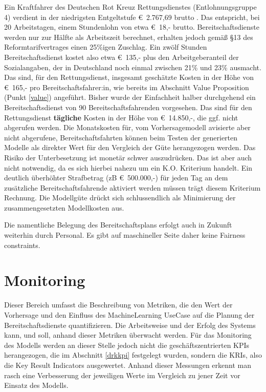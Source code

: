 Ein Kraftfahrer des Deutschen Rot Kreuz Rettungsdienstes (Entlohnungsgruppe 4) verdient in der niedrigsten Entgeltstufe €~2.767,69 brutto \citep{deutsches_rotes_kreuz_drk-reformtarifvertrag_2023}. Das entspricht, bei 20 Arbeitstagen, einem Stundenlohn von etwa €~18,- brutto. Bereitschaftsdienste werden nur zur Hälfte als Arbeitszeit berechnet, erhalten jedoch gemäß §13 des Reformtarifvertrages einen 25\%igen Zuschlag. Ein zwölf Stunden Bereitschaftsdienst kostet also etwa €~135,- plus den Arbeitgeberanteil der Sozialangaben, der in Deutschland noch einmal zwischen 21\% und 23\% ausmacht. Das sind, für den Rettungsdienst, insgesamt geschätzte Kosten in der Höhe von €~165,- pro Bereitschaftsfahrer:in, wie bereits im Abschnitt Value Proposition (Punkt \ref{value}) angeführt. Bisher wurde der Einfachheit halber durchgehend ein Bereitschaftsdienst von 90 Bereitschaftsfahrenden vorgesehen. Das sind für den Rettungsdienst \textbf{tägliche} Kosten in der Höhe von €~14.850,-, die ggf. nicht abgerufen werden. Die Monatskosten für, vom Vorhersagemodell avisierte aber nicht abgerufene, Bereitschaftsfahrten können beim Testen der generierten Modelle als direkter Wert für den Vergleich der Güte herangezogen werden. Das Risiko der Unterbesetzung ist monetär schwer auszudrücken. Das ist aber auch nicht notwendig, da es sich hierbei nahezu um ein K.O. Kriterium handelt. Ein deutlich überhöhter Strafbetrag (zB €~500.000,-) für jeden Tag an dem zusätzliche Bereitschaftsfahrende aktiviert werden müssen trägt diesem Kriterium Rechnung. Die Modellgüte drückt sich schlussendlich als Minimierung der zusammengesetzten Modellkosten aus. 

Die namentliche Belegung des Bereitschaftsplans erfolgt auch in Zukunft weiterhin durch Personal. Es gibt auf maschineller Seite daher keine Fairness constraints. 


\section{Monitoring}

Dieser Bereich umfasst die Beschreibung von Metriken, die den Wert der Vorhersage und den Einfluss des MachineLearning UseCase auf die Planung der Bereitschaftsdienste quantifizieren. Die Arbeitsweise und der Erfolg des Systems kann, und soll, anhand dieser Metriken überwacht werden. Für das Monitoring des Modells werden an dieser Stelle jedoch nicht die geschäftszentrierten KPIs herangezogen, die im Abschnitt \ref{drkkpi} festgelegt wurden, sondern die KRIs, also die Key Result Indicators ausgewertet. Anhand dieser Messungen erkennt man rasch eine Verbesserung der jeweiligen Werte im Vergleich zu jener Zeit vor Einsatz des Modells. 

